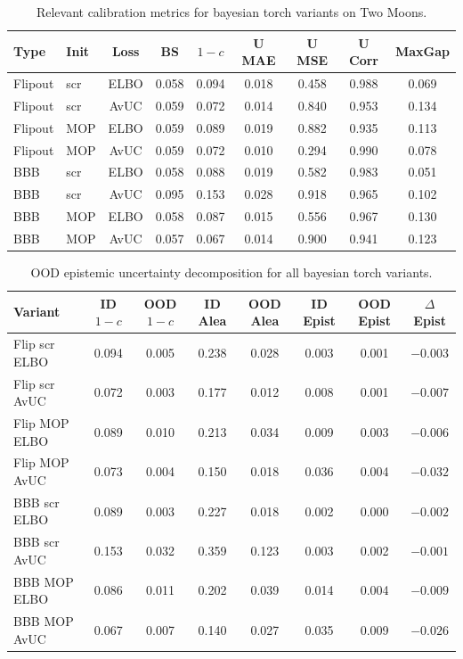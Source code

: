 \documentclass[12pt,a4paper]{article}
\begin{document}
\begin{table}[H]
  \centering
  \caption{Relevant calibration metrics for bayesian torch variants on Two Moons.}
  \label{tab:bnn_main_subset}
  \small\setlength{\tabcolsep}{4pt}
  \begin{tabular}{llccccccc}
    \toprule
    Type & Init & Loss & BS & $1 - c$ & U MAE & U MSE & U Corr & MaxGap \\
    \midrule
    Flipout & scr & ELBO & 0.058 & 0.094 & 0.018 & 0.458 & 0.988 & 0.069 \\
    Flipout & scr & AvUC & 0.059 & 0.072 & 0.014 & 0.840 & 0.953 & 0.134 \\
    Flipout & MOP & ELBO & 0.059 & 0.089 & 0.019 & 0.882 & 0.935 & 0.113 \\
    Flipout & MOP & AvUC & 0.059 & 0.072 & 0.010 & 0.294 & 0.990 & 0.078 \\
    BBB & scr & ELBO & 0.058 & 0.088 & 0.019 & 0.582 & 0.983 & 0.051 \\
    BBB & scr & AvUC & 0.095 & 0.153 & 0.028 & 0.918 & 0.965 & 0.102 \\
    BBB & MOP & ELBO & 0.058 & 0.087 & 0.015 & 0.556 & 0.967 & 0.130 \\
    BBB & MOP & AvUC & 0.057 & 0.067 & 0.014 & 0.900 & 0.941 & 0.123 \\
    \bottomrule
  \end{tabular}
\end{table}

\begin{table}[H]
  \centering
  \caption{OOD epistemic uncertainty decomposition for all bayesian torch variants.}
  \label{tab:ood}
  \small\setlength{\tabcolsep}{4pt}
  \begin{tabular}{lccccccc}
    \toprule
    Variant & ID $1 - c$ & OOD $1 - c$ & ID Alea & OOD Alea & ID Epist & OOD Epist & $\Delta$Epist \\
    \midrule
    Flip scr ELBO & 0.094 & 0.005 & 0.238 & 0.028 & 0.003 & 0.001 & $-0.003$ \\
    Flip scr AvUC & 0.072 & 0.003 & 0.177 & 0.012 & 0.008 & 0.001 & $-0.007$ \\
    Flip MOP ELBO & 0.089 & 0.010 & 0.213 & 0.034 & 0.009 & 0.003 & $-0.006$ \\
    Flip MOP AvUC & 0.073 & 0.004 & 0.150 & 0.018 & 0.036 & 0.004 & $-0.032$ \\
    BBB scr ELBO  & 0.089 & 0.003 & 0.227 & 0.018 & 0.002 & 0.000 & $-0.002$ \\
    BBB scr AvUC  & 0.153 & 0.032 & 0.359 & 0.123 & 0.003 & 0.002 & $-0.001$ \\
    BBB MOP ELBO  & 0.086 & 0.011 & 0.202 & 0.039 & 0.014 & 0.004 & $-0.009$ \\
    BBB MOP AvUC  & 0.067 & 0.007 & 0.140 & 0.027 & 0.035 & 0.009 & $-0.026$ \\
    \bottomrule
  \end{tabular}
\end{table}
\end{document}

